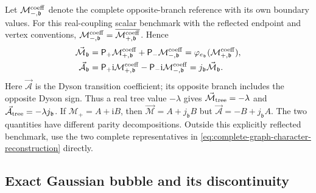 \documentclass[final,5p,times,twocolumn,numbers,nopreprintline]{elsarticle}
\numberwithin{equation}{section}
\theoremstyle{definition}
\theoremstyle{remark}
\newcommand{\ii}{\mathrm i}
\newcommand{\bb}{\mathfrak b}
\newcommand{\ee}{e_{\bb}}
\newcommand{\je}{j_{\bb}}
\newcommand{\embed}{\varphi_{\ee}}
\begin{document}
Let \(\mathcal M^{\rm coeff}_{-,\bb}\) denote the complete
opposite-branch reference with its own boundary values. For this
real-coupling scalar benchmark with the reflected endpoint and
vertex conventions,
\(\mathcal M^{\rm coeff}_{-,\bb}
=\overline{\mathcal M^{\rm coeff}_{+,\bb}}\). Hence
\begin{align}
 \vec{\mathcal M}_{\bb}
 &=\mathsf P_+\mathcal M^{\rm coeff}_{+,\bb}
      +\mathsf P_-\mathcal M^{\rm coeff}_{-,\bb}
   =\embed(\mathcal M^{\rm coeff}_{+,\bb}),\nonumber\\
 \vec{\mathcal A}_{\bb}
 &=\mathsf P_+\ii\mathcal M^{\rm coeff}_{+,\bb}
      -\mathsf P_-\ii\mathcal M^{\rm coeff}_{-,\bb}
   =\je\vec{\mathcal M}_{\bb}.
 \label{eq:scalar-benchmark-Dyson-reconstruction}
\end{align}
Here \(\vec{\mathcal A}\) is the Dyson transition coefficient;
its opposite branch includes the opposite Dyson sign. Thus a real
tree value \(-\lambda\) gives
\(\vec{\mathcal M}_{\rm tree}=-\lambda\) and
\(\vec{\mathcal A}_{\rm tree}=-\lambda\je\).
If \(\mathcal M_+=A+\ii B\), then
\(\vec{\mathcal M}=A+\je B\) but
\(\vec{\mathcal A}=-B+\je A\). The two quantities have
different parity decompositions. Outside this explicitly reflected
benchmark, use the two complete representatives in
\eqref{eq:complete-graph-character-reconstruction} directly.

\subsection{Exact Gaussian bubble and its discontinuity}
\label{sec:gaussian-bubble}
\end{document}
